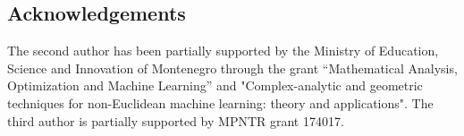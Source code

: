 \documentclass[a4paper,10pt]{amsart}
\begin{document}
\subsection*{Acknowledgements} The second author has been partially supported by the Ministry of Education, Science and Innovation of Montenegro through the grant ``Mathematical Analysis, Optimization and Machine Learning'' and "Complex-analytic and geometric techniques for non-Euclidean machine learning: theory and applications". The third author is partially supported by MPNTR grant 174017.







\end{document}
